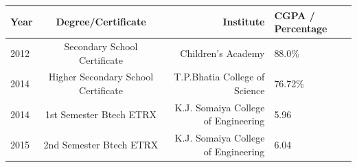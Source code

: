 \documentclass[letterpaper,11pt]{article}
\begin{document}
\begin{table}[h!]
  \begin{center}
      \begin{tabular}{l|c|r|l} %
      \hspace{0.2cm}\textbf{Year}\hspace{0.2cm} &\hspace{0.2cm} \textbf{Degree/Certificate}\hspace{0.2cm} &\hspace{0.2cm} \textbf{Institute}\hspace{2.3cm} &\hspace{0.2cm} \textbf{CGPA / Percentage}\hspace{0.2cm}\\
      \hline
       2012 & \hspace{0.2cm} Secondary School Certificate \hspace{0.2cm} & \hspace{0.2cm}Children's Academy\hspace{1.7cm} & \hspace{1.2cm} 88.0\% \hspace{0.2cm}\\
       2014 & \hspace{0.2cm} Higher Secondary School Certificate \hspace{0.2cm} & \hspace{0.2cm}T.P.Bhatia College of Science\hspace{1.7cm} & \hspace{1.2cm} 76.72\% \hspace{0.2cm}\\
      2014 & \hspace{0.2cm} 1st Semester Btech ETRX \hspace{0.2cm} & \hspace{0.2cm}K.J. Somaiya College of Engineering\hspace{0.2cm} & \hspace{1.2cm} 5.96\hspace{0.2cm}\\
		2015 & \hspace{0.2cm} 2nd Semester Btech ETRX \hspace{0.2cm} & \hspace{0.2cm}K.J. Somaiya College of Engineering\hspace{0.2cm} & \hspace{1.2cm} 6.04 \hspace{0.2cm}\\

\end{tabular}
\end{center}
\end{table}
\end{document}
